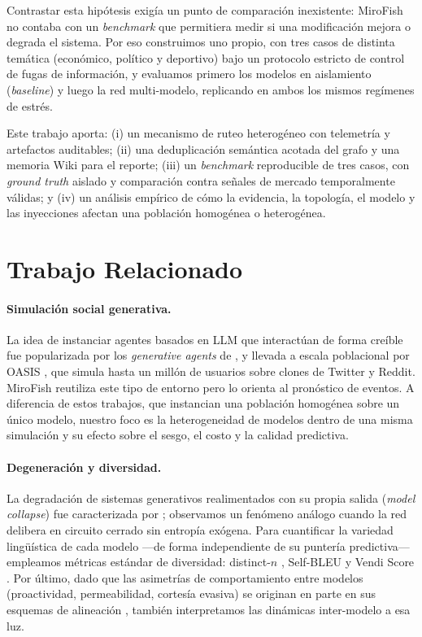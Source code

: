 \documentclass[11pt]{article}
\begin{document}
Contrastar esta hipótesis exigía un punto de comparación inexistente: MiroFish no contaba con un \textit{benchmark} que permitiera medir si una modificación mejora o degrada el sistema. Por eso construimos uno propio, con tres casos de distinta temática (económico, político y deportivo) bajo un protocolo estricto de control de fugas de información, y evaluamos primero los modelos en aislamiento (\textit{baseline}) y luego la red multi-modelo, replicando en ambos los mismos regímenes de estrés.

Este trabajo aporta: (i) un mecanismo de ruteo heterogéneo con telemetría y artefactos auditables; (ii) una deduplicación semántica acotada del grafo y una memoria Wiki para el reporte; (iii) un \textit{benchmark} reproducible de tres casos, con \textit{ground truth} aislado y comparación contra señales de mercado temporalmente válidas; y (iv) un análisis empírico de cómo la evidencia, la topología, el modelo y las inyecciones afectan una población homogénea o heterogénea.

\section{Trabajo Relacionado}
\label{sec:related}

\paragraph{Simulación social generativa.} La idea de instanciar agentes basados en LLM que interactúan de forma creíble fue popularizada por los \textit{generative agents} de \citet{park2023generative}, y llevada a escala poblacional por OASIS \citep{yang2024oasis}, que simula hasta un millón de usuarios sobre clones de Twitter y Reddit. MiroFish \citep{mirofish2025} reutiliza este tipo de entorno pero lo orienta al pronóstico de eventos. A diferencia de estos trabajos, que instancian una población homogénea sobre un único modelo, nuestro foco es la heterogeneidad de modelos dentro de una misma simulación y su efecto sobre el sesgo, el costo y la calidad predictiva.

\paragraph{Degeneración y diversidad.} La degradación de sistemas generativos realimentados con su propia salida (\textit{model collapse}) fue caracterizada por \citet{shumailov2024collapse}; observamos un fenómeno análogo cuando la red delibera en circuito cerrado sin entropía exógena. Para cuantificar la variedad lingüística de cada modelo —de forma independiente de su puntería predictiva— empleamos métricas estándar de diversidad: distinct-$n$ \citep{li2016diversity}, Self-BLEU \citep{zhu2018texygen} y Vendi Score \citep{friedman2023vendi}. Por último, dado que las asimetrías de comportamiento entre modelos (proactividad, permeabilidad, cortesía evasiva) se originan en parte en sus esquemas de alineación \citep{ouyang2022instructgpt}, también interpretamos las dinámicas inter-modelo a esa luz.
\end{document}
